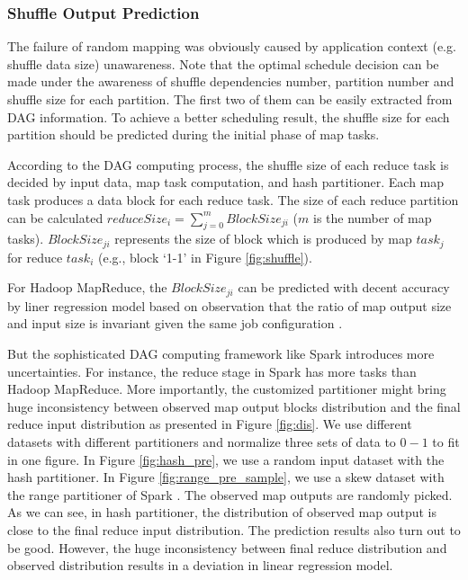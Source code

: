 \subsubsection{Shuffle Output Prediction}\label{shuffleprediction}
The failure of random mapping was obviously caused by application context (e.g. shuffle data size) unawareness. Note that the optimal schedule decision can be made under the awareness of shuffle dependencies number, partition number and shuffle size for each partition. The first two of them can be easily extracted from DAG information. To achieve a better scheduling result, the shuffle size for each partition should be predicted during the initial phase of map tasks.

According to the DAG computing process, the shuffle size of each reduce task is decided by input data, map task computation, and hash partitioner. Each map task produces a data block for each reduce task. The size of each reduce partition can be calculated $reduceSize_i = \sum_{j=0}^{m} {BlockSize_{ji}}$ ($m$ is the number of map tasks). $BlockSize_{ji}$ represents the size of block which is produced by map $task_j$ for reduce $task_i$ (e.g., block `1-1' in Figure \ref{fig:shuffle}).

For Hadoop MapReduce, the $BlockSize_{ji}$ can be predicted with decent accuracy by liner regression model based on observation that the ratio of map output size and input size is invariant given the same job configuration \cite{ishuffle, predict}.

But the sophisticated DAG computing framework like Spark introduces more uncertainties. For instance, the reduce stage in Spark has more tasks than Hadoop MapReduce. More importantly, the customized partitioner might bring huge inconsistency between observed map output blocks distribution and the final reduce input distribution as presented in Figure \ref{fig:dis}. We use different datasets with different partitioners and normalize three sets of data to $0-1$ to fit in one figure. In Figure \ref{fig:hash_pre}, we use a random input dataset with the hash partitioner. In Figure \ref{fig:range_pre_sample}, we use a skew dataset with the range partitioner of Spark \cite{sparksource}.
The observed map outputs are randomly picked. As we can see, in hash partitioner, the distribution of observed map output is close to the final reduce input distribution. The prediction results also turn out to be good. However, the huge inconsistency between final reduce distribution and observed distribution results in a deviation in linear regression model.


